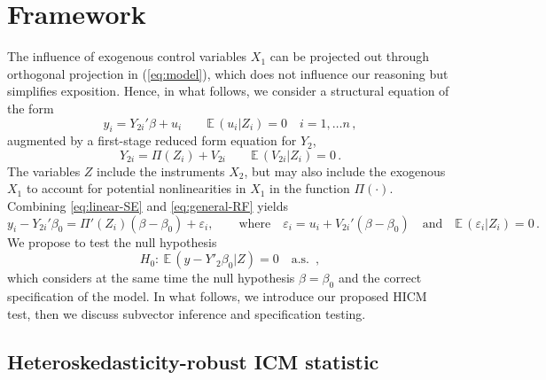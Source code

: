 \documentclass[12pt]{article}
\newcommand{\E}{\operatorname{E}}
\newcommand{\1}{\mathbf{1}}
\def\E{\mathbb{E}\,}
\begin{document}
\section{Framework}\label{sec.frame}

The influence of exogenous control variables $X_{1}$ can be projected
out through orthogonal projection in (\ref{eq:model}), which does not
influence our reasoning but simplifies exposition.  Hence, in what
follows, we consider a structural equation of the form
\begin{equation} \label{eq:linear-SE}
y_i  =  Y_{2i}' \beta + u_{i}  \qquad \E(u_i|Z_i)= 0  \quad i=1, \ldots n \, ,
\end{equation}
augmented by a first-stage reduced form equation for $Y_2$,
\begin{equation} \label{eq:general-RF}
Y_{2i} = \Pi(Z_{i}) + V_{2i} \qquad \E(V_{2i}|Z_i)= 0 \, .
\end{equation}
The variables $Z$ include the instruments $X_{2}$, but may also
include the exogenous $X_{1}$ to account for potential nonlinearities in $X_{1}$
in the function $\Pi(\cdot)$. Combining \eqref{eq:linear-SE} and
\eqref{eq:general-RF} yields
\[
y_i - Y_{2i}'\beta_{0} = \Pi'(Z_i) \left(\beta-\beta_0\right) + \varepsilon_i,
\qquad \text{where} \quad \varepsilon_i = u_i + V_{2i}' \left(\beta - \beta_{0}\right)
\quad \text{and} \quad \E\left(\varepsilon_i|Z_i\right)=0
\, .
\]
We propose to test the null hypothesis
\begin{equation}
\label{eq:H0}
H_{0}: \  \E(y - Y'_{2}\beta_{0}|Z) = 0
\quad \mbox{a.s. }
\, ,
\end{equation}
which considers at the same time the null hypothesis $\beta = \beta_0$ and the correct
specification of the model.
In what follows, we introduce our proposed HICM test, then we discuss
subvector inference and specification testing.

\subsection{Heteroskedasticity-robust ICM statistic} \label{sub:HICM}
\end{document}
